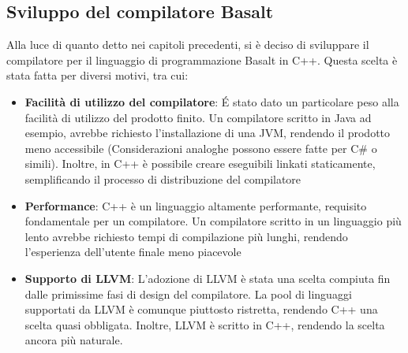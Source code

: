 \subsection{Sviluppo del compilatore Basalt}
Alla luce di quanto detto nei capitoli precedenti, si è deciso di sviluppare il compilatore 
per il linguaggio di programmazione Basalt in C++. Questa scelta è stata fatta per diversi motivi, 
tra cui:

\begin{itemize}
    \item \textbf{Facilità di utilizzo del compilatore}: É stato dato un particolare peso alla facilità di utilizzo 
    del prodotto finito. Un compilatore scritto in Java ad esempio, avrebbe richiesto l'installazione di una JVM, 
    rendendo il prodotto meno accessibile (Considerazioni analoghe possono essere fatte per C\# o simili). 
    Inoltre, in C++ è possibile creare eseguibili linkati staticamente, semplificando il processo di 
    distribuzione del compilatore
    
    \item \textbf{Performance}: C++ è un linguaggio altamente performante, requisito
    fondamentale per un compilatore. Un compilatore scritto in un linguaggio più lento avrebbe richiesto
    tempi di compilazione più lunghi, rendendo l'esperienza dell'utente finale meno piacevole

    \item \textbf{Supporto di LLVM}: L'adozione di LLVM è stata una scelta compiuta fin dalle primissime fasi di 
    design del compilatore. La pool di linguaggi supportati da LLVM è comunque piuttosto ristretta, rendendo 
    C++ una scelta quasi obbligata. Inoltre, LLVM è scritto in C++, rendendo la scelta ancora più naturale.
\end{itemize}


